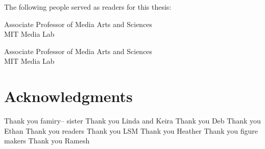 %
%
%

\begin{titlepage}
\begin{large}
The following people served as readers for this thesis:

\signature{Sepandar Kamvar}{Associate Professor of Media Arts and Sciences \\
   MIT Media Lab}

\signature{Iyad Rahwan}{Associate Professor of Media Arts and Sciences \\
   MIT Media Lab}
 
\end{large}
\end{titlepage}
 
\cleardoublepage

\section*{Acknowledgments}

Thank you famiry-- sister
Thank you Linda and Keira
Thank you Deb
Thank you Ethan
Thank you readers
Thank you LSM
Thank you Heather
Thank you figure makers 
Thank you Ramesh


